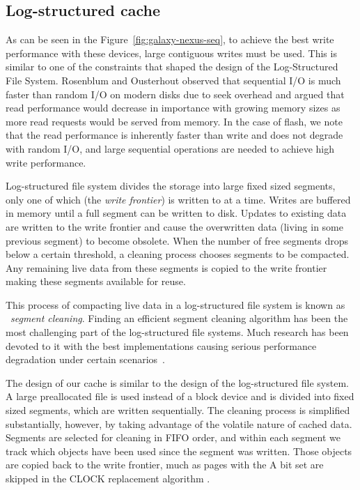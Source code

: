 \documentclass[letterpaper,twocolumn,10pt]{article}
\begin{document}
\subsection{Log-structured cache}
As can be seen in the Figure~\ref{fig:galaxy-nexus-seq}, to achieve the best
write performance with these devices, large contiguous writes must be used.
This is similar to one of the constraints that shaped the design of the
Log-Structured File System.  Rosenblum and Ousterhout observed that sequential
I/O is much faster than random I/O on modern disks due to seek overhead and
argued that read performance would decrease in importance with growing memory
sizes as more read requests would be served from memory.  In the case of flash,
we note that the read performance is inherently faster than write and does not
degrade with random I/O, and large sequential operations are needed to
achieve high write performance.

Log-structured file system divides the storage into large fixed sized segments,
only one of which (the \emph{write frontier}) is written to at a time.  Writes
are buffered in memory until a full segment can be written to disk.  Updates to
existing data are written to the write frontier and cause the overwritten data
(living in some previous segment) to become obsolete.  When the number of free
segments drops below a certain threshold, a cleaning process chooses segments to
be compacted.  Any remaining live data from these segments is copied to the
write frontier making these segments available for reuse.

This process of compacting live data in a log-structured file system is known as
~\emph{segment cleaning}.  Finding an efficient segment cleaning algorithm has
been the most challenging part of the log-structured file systems.  Much
research has been devoted to it with the best implementations causing serious
performance degradation under certain scenarios~\cite{seltzer93}.

The design of our cache is similar to the design of the log-structured file
system.  A large preallocated file is used instead of a block device and is
divided into fixed sized segments, which are written sequentially. The
cleaning process is simplified substantially, however, by taking
advantage of the volatile nature of cached data. Segments are selected
for cleaning in FIFO order, and within each segment we track which
objects have been used since the segment was written. Those objects
are copied back to the write frontier, much as pages with the A bit
set are skipped in the CLOCK replacement algorithm \cite{corbato_paging_1969}.
\end{document}
